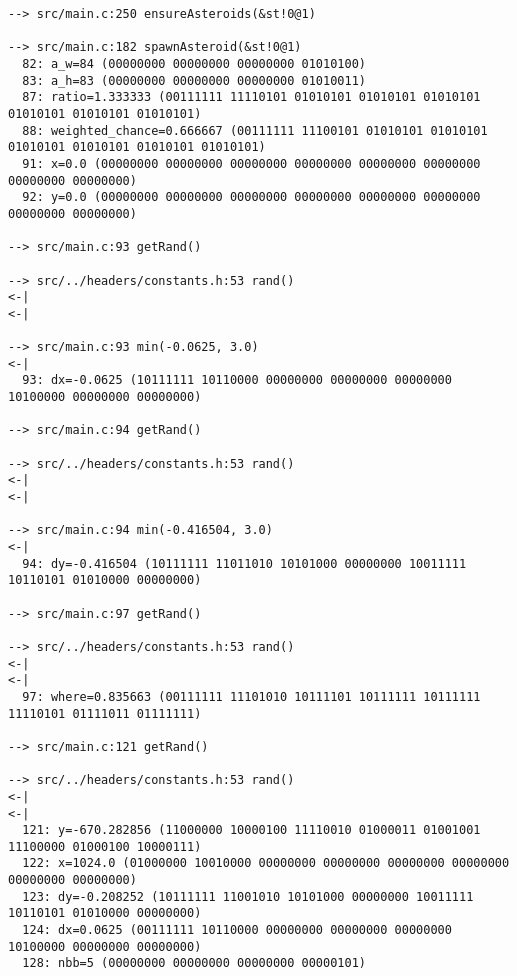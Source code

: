 \begin{verbatim}
--> src/main.c:250 ensureAsteroids(&st!0@1)

--> src/main.c:182 spawnAsteroid(&st!0@1)
  82: a_w=84 (00000000 00000000 00000000 01010100)
  83: a_h=83 (00000000 00000000 00000000 01010011)
  87: ratio=1.333333 (00111111 11110101 01010101 01010101 01010101 01010101 01010101 01010101)
  88: weighted_chance=0.666667 (00111111 11100101 01010101 01010101 01010101 01010101 01010101 01010101)
  91: x=0.0 (00000000 00000000 00000000 00000000 00000000 00000000 00000000 00000000)
  92: y=0.0 (00000000 00000000 00000000 00000000 00000000 00000000 00000000 00000000)

--> src/main.c:93 getRand()

--> src/../headers/constants.h:53 rand()
<-|
<-|

--> src/main.c:93 min(-0.0625, 3.0)
<-|
  93: dx=-0.0625 (10111111 10110000 00000000 00000000 00000000 10100000 00000000 00000000)

--> src/main.c:94 getRand()

--> src/../headers/constants.h:53 rand()
<-|
<-|

--> src/main.c:94 min(-0.416504, 3.0)
<-|
  94: dy=-0.416504 (10111111 11011010 10101000 00000000 10011111 10110101 01010000 00000000)

--> src/main.c:97 getRand()

--> src/../headers/constants.h:53 rand()
<-|
<-|
  97: where=0.835663 (00111111 11101010 10111101 10111111 10111111 11110101 01111011 01111111)

--> src/main.c:121 getRand()

--> src/../headers/constants.h:53 rand()
<-|
<-|
  121: y=-670.282856 (11000000 10000100 11110010 01000011 01001001 11100000 01000100 10000111)
  122: x=1024.0 (01000000 10010000 00000000 00000000 00000000 00000000 00000000 00000000)
  123: dy=-0.208252 (10111111 11001010 10101000 00000000 10011111 10110101 01010000 00000000)
  124: dx=0.0625 (00111111 10110000 00000000 00000000 00000000 10100000 00000000 00000000)
  128: nbb=5 (00000000 00000000 00000000 00000101)


\end{verbatim}
